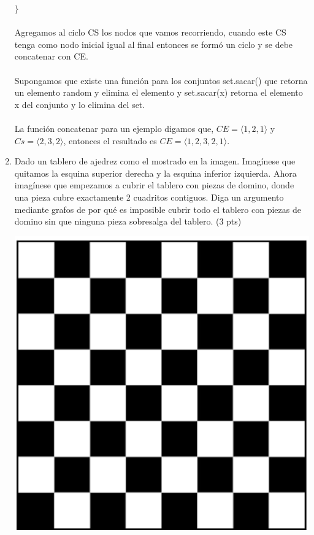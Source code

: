 \documentclass[a4paper,12pt]{article}
\begin{document}
\begin{enumerate}
\begin{flushleft}
$\}$ \\
$~~$ \\
Agregamos al ciclo CS los nodos que vamos recorriendo, cuando este CS tenga como nodo inicial igual al final entonces se formó un ciclo y se debe concatenar con CE. \\
$~~$ \\
Supongamos que existe una función para los conjuntos set.sacar() que retorna un elemento random y elimina el elemento y set.sacar(x) retorna el elemento x del conjunto y lo elimina del set. \\
$~~$ \\
La función concatenar para un ejemplo digamos que, $CE = \langle 1, 2, 1 \rangle$ y $Cs = \langle 2, 3, 2 \rangle$, entonces el resultado es $CE = \langle 1, 2, 3, 2, 1 \rangle$.
\end{flushleft}

\item Dado un tablero de ajedrez como el mostrado en la imagen. Imagínese que quitamos la esquina superior derecha y la esquina inferior izquierda. Ahora imagínese que empezamos a cubrir el tablero con piezas de domino, donde una pieza cubre exactamente 2 cuadritos contiguos. 
Diga un argumento mediante grafos de por qué es imposible cubrir todo el tablero con piezas de domino sin que ninguna pieza sobresalga del tablero. (3 pts)

\begin{center}
\par \includegraphics[scale=0.8]{im2} \par
\end{center}


\end{enumerate}
\end{document}
